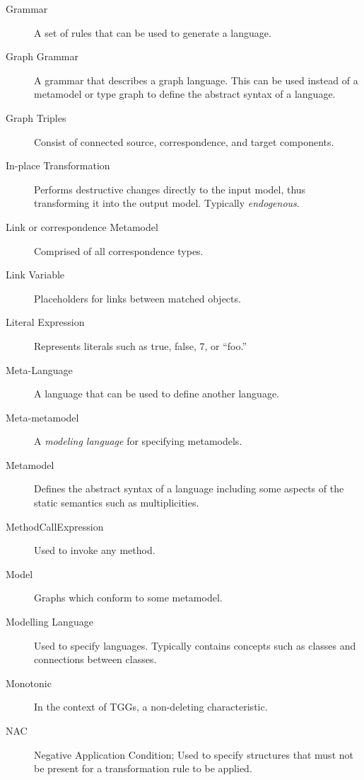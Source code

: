 \begin{description}
\item[Grammar] %
A set of rules that can be used to generate a language. 

\item[Graph Grammar] %
A grammar that describes a graph language. This can be used instead of a metamodel or type graph to define the abstract syntax of a language.

\item[Graph Triples] %
Consist of connected source, correspondence, and target components.

\item[In-place Transformation] 
Performs destructive changes directly to the input model, thus transforming it into the output model. Typically \emph{endogenous}.

\item[Link or correspondence Metamodel] %
Comprised of all correspondence types.

\item[Link Variable] %
Placeholders for links between matched objects.

\item[Literal Expression] %
Represents literals such as true, false, 7, or ``foo.''

\item[Meta-Language] %
A language that can be used to define another language.

\item[Meta-metamodel] %
A \emph{modeling language} for specifying metamodels.

\item[Metamodel] %
Defines the abstract syntax of a language including some aspects of the static semantics such as multiplicities. 

\item[MethodCallExpression] %
Used to invoke any method.

\item[Model] %
Graphs which conform to some metamodel.

\item[Modelling Language] %
Used to specify languages. Typically contains concepts such as classes and connections between classes.

\item[Monotonic] %
In the context of TGGs, a non-deleting characteristic.

\item[NAC] %
Negative Application Condition; Used to specify structures that must not be present for a transformation rule to be applied.


\end{description}
